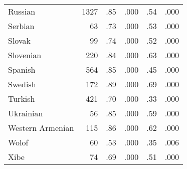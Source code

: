 \begin{longtable}{lrrrrr}
    Russian & 1327 & .85 & .000 & .54 & .000 \\
    Serbian & 63 & .73 & .000 & .53 & .000 \\
    Slovak & 99 & .74 & .000 & .52 & .000 \\
    Slovenian & 220 & .84 & .000 & .63 & .000 \\
    Spanish & 564 & .85 & .000 & .45 & .000 \\
    Swedish & 172 & .89 & .000 & .69 & .000 \\
    Turkish & 421 & .70 & .000 & .33 & .000 \\
    Ukrainian & 56 & .85 & .000 & .59 & .000 \\
    Western Armenian & 115 & .86 & .000 & .62 & .000 \\
    Wolof & 60 & .53 & .000 & .35 & .006 \\
    Xibe & 74 & .69 & .000 & .51 & .000 \\
\end{longtable}
